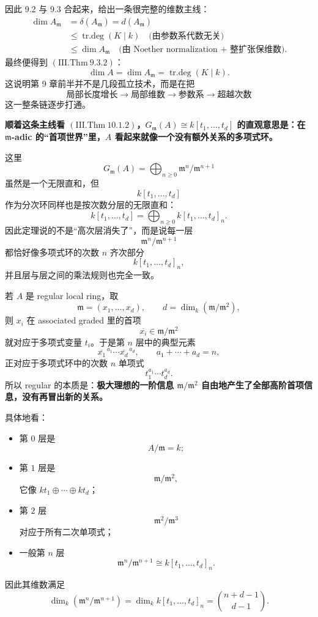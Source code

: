 \documentclass[a4paper]{ctexart}
\theoremstyle{definition}
\theoremstyle{analysis}
\theoremstyle{plain}
\begin{document}
\medskip

因此 9.2 与 9.3 合起来，给出一条很完整的维数主线：
\[
  \begin{aligned}
    \dim A_{\mathfrak m}
    &= \delta(A_{\mathfrak m})
    = d(A_{\mathfrak m}) \\
    &\le \operatorname{tr.deg}(K\mid k)
    \quad\text{(由参数系代数无关)} \\
    &\le \dim A_{\mathfrak m}
    \quad\text{(由 Noether normalization + 整扩张保维数)}.
  \end{aligned}
\]
最终便得到 \((\mathrm{III.Thm}\ 9.3.2)\)：
\[
  \dim A=\dim A_{\mathfrak m}=\operatorname{tr.deg}(K\mid k).
\]
这说明第 9 章前半并不是几段孤立技术，而是在把
\[
  \text{局部长度增长}
  \longrightarrow
  \text{局部维数}
  \longrightarrow
  \text{参数系}
  \longrightarrow
  \text{超越次数}
\]
这一整条链逐步打通。

\medskip

\label{rem:regular-graded-intuition}
\textbf{顺着这条主线看 \((\mathrm{III.Thm}\ 10.1.2)\)，\(G_{\mathfrak m}(A)\cong k[t_1,\dots,t_d]\) 的直观意思是：在 \(\mathfrak m\)-adic 的“首项世界”里，\(A\) 看起来就像一个没有额外关系的多项式环。}

这里
\[
  G_{\mathfrak m}(A)
  =
  \bigoplus_{n\ge 0}\mathfrak m^n/\mathfrak m^{n+1}
\]
虽然是一个无限直和，但
\[
  k[t_1,\dots,t_d]
\]
作为分次环同样也是按次数分层的无限直和：
\[
  k[t_1,\dots,t_d]
  =
  \bigoplus_{n\ge 0} k[t_1,\dots,t_d]_n.
\]
因此定理说的不是“高次层消失了”，而是说每一层
\[
  \mathfrak m^n/\mathfrak m^{n+1}
\]
都恰好像多项式环的次数 \(n\) 齐次部分
\[
  k[t_1,\dots,t_d]_n,
\]
并且层与层之间的乘法规则也完全一致。

\medskip

若 \(A\) 是 regular local ring，取
\[
  \mathfrak m=(x_1,\dots,x_d),
  \qquad
  d=\dim_k(\mathfrak m/\mathfrak m^2),
\]
则 \(x_i\) 在 associated graded 里的首项
\[
  \overline{x_i}\in \mathfrak m/\mathfrak m^2
\]
就对应于多项式变量 \(t_i\)。于是第 \(n\) 层中的典型元素
\[
  \overline{x_1}^{\,a_1}\cdots \overline{x_d}^{\,a_d},
  \qquad
  a_1+\cdots+a_d=n,
\]
正对应于多项式环中的次数 \(n\) 单项式
\[
  t_1^{a_1}\cdots t_d^{a_d}.
\]
所以 regular 的本质是：\textbf{极大理想的一阶信息 \(\mathfrak m/\mathfrak m^2\) 自由地产生了全部高阶首项信息，没有再冒出新的关系。}

\medskip

具体地看：
\begin{itemize}
  \item 第 \(0\) 层是
  \[
    A/\mathfrak m=k;
  \]
  \item 第 \(1\) 层是
  \[
    \mathfrak m/\mathfrak m^2,
  \]
  它像 \(kt_1\oplus\cdots\oplus kt_d\)；
  \item 第 \(2\) 层
  \[
    \mathfrak m^2/\mathfrak m^3
  \]
  对应于所有二次单项式；
  \item 一般第 \(n\) 层
  \[
    \mathfrak m^n/\mathfrak m^{n+1}
    \cong k[t_1,\dots,t_d]_n.
  \]
\end{itemize}
因此其维数满足
\[
  \dim_k(\mathfrak m^n/\mathfrak m^{n+1})
  =
  \dim_k k[t_1,\dots,t_d]_n
  =
  \binom{n+d-1}{d-1}.
\]
\end{document}
